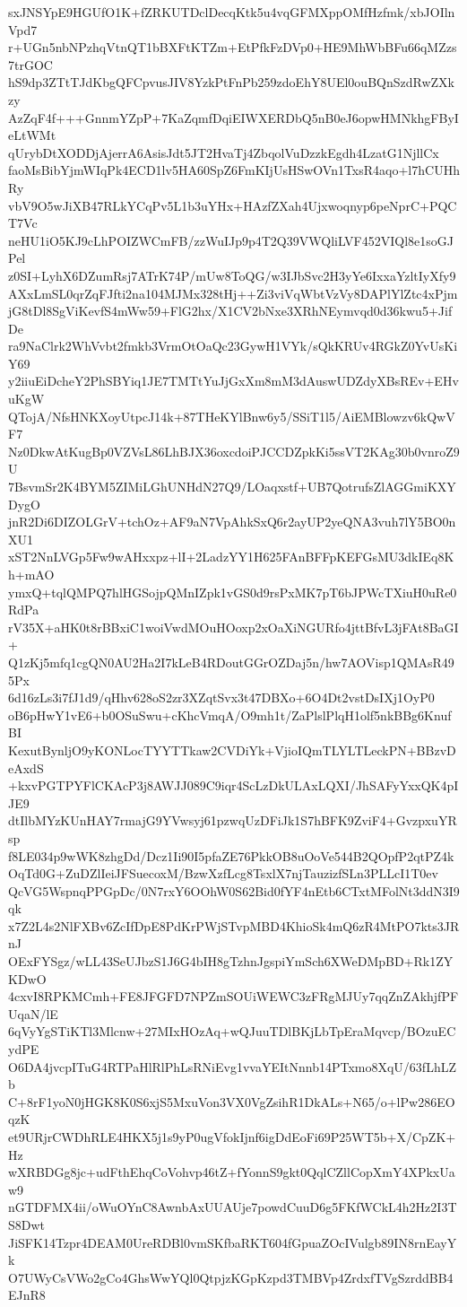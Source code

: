 sxJNSYpE9HGUfO1K+fZRKUTDclDecqKtk5u4vqGFMXppOMfHzfmk/xbJOIlnVpd7
r+UGn5nbNPzhqVtnQT1bBXFtKTZm+EtPfkFzDVp0+HE9MhWbBFu66qMZzs7trGOC
hS9dp3ZTtTJdKbgQFCpvusJIV8YzkPtFnPb259zdoEhY8UEl0ouBQnSzdRwZXkzy
AzZqF4f+++GnnmYZpP+7KaZqmfDqiEIWXERDbQ5nB0eJ6opwHMNkhgFByIeLtWMt
qUrybDtXODDjAjerrA6AsisJdt5JT2HvaTj4ZbqolVuDzzkEgdh4LzatG1NjllCx
faoMsBibYjmWIqPk4ECD1lv5HA60SpZ6FmKIjUsHSwOVn1TxsR4aqo+l7hCUHhRy
vbV9O5wJiXB47RLkYCqPv5L1b3uYHx+HAzfZXah4Ujxwoqnyp6peNprC+PQCT7Vc
neHU1iO5KJ9cLhPOIZWCmFB/zzWuIJp9p4T2Q39VWQliLVF452VIQl8e1soGJPel
z0SI+LyhX6DZumRsj7ATrK74P/mUw8ToQG/w3IJbSvc2H3yYe6IxxaYzltIyXfy9
AXxLmSL0qrZqFJfti2na104MJMx328tHj++Zi3viVqWbtVzVy8DAPlYlZtc4xPjm
jG8tDl8SgViKevfS4mWw59+FlG2hx/X1CV2bNxe3XRhNEymvqd0d36kwu5+JifDe
ra9NaClrk2WhVvbt2fmkb3VrmOtOaQc23GywH1VYk/sQkKRUv4RGkZ0YvUsKiY69
y2iiuEiDcheY2PhSBYiq1JE7TMTtYuJjGxXm8mM3dAuswUDZdyXBsREv+EHvuKgW
QTojA/NfsHNKXoyUtpcJ14k+87THeKYlBnw6y5/SSiT1l5/AiEMBlowzv6kQwVF7
Nz0DkwAtKugBp0VZVsL86LhBJX36oxcdoiPJCCDZpkKi5ssVT2KAg30b0vnroZ9U
7BsvmSr2K4BYM5ZIMiLGhUNHdN27Q9/LOaqxstf+UB7QotrufsZlAGGmiKXYDygO
jnR2Di6DIZOLGrV+tchOz+AF9aN7VpAhkSxQ6r2ayUP2yeQNA3vuh7lY5BO0nXU1
xST2NnLVGp5Fw9wAHxxpz+lI+2LadzYY1H625FAnBFFpKEFGsMU3dkIEq8Kh+mAO
ymxQ+tqlQMPQ7hlHGSojpQMnIZpk1vGS0d9rsPxMK7pT6bJPWcTXiuH0uRe0RdPa
rV35X+aHK0t8rBBxiC1woiVwdMOuHOoxp2xOaXiNGURfo4jttBfvL3jFAt8BaGI+
Q1zKj5mfq1cgQN0AU2Ha2I7kLeB4RDoutGGrOZDaj5n/hw7AOVisp1QMAsR495Px
6d16zLs3i7fJ1d9/qHhv628oS2zr3XZqtSvx3t47DBXo+6O4Dt2vstDsIXj1OyP0
oB6pHwY1vE6+b0OSuSwu+cKhcVmqA/O9mh1t/ZaPlslPlqH1olf5nkBBg6KnufBI
KexutBynljO9yKONLocTYYTTkaw2CVDiYk+VjioIQmTLYLTLeckPN+BBzvDeAxdS
+kxvPGTPYFlCKAcP3j8AWJJ089C9iqr4ScLzDkULAxLQXI/JhSAFyYxxQK4pIJE9
dtIlbMYzKUnHAY7rmajG9YVwsyj61pzwqUzDFiJk1S7hBFK9ZviF4+GvzpxuYRsp
f8LE034p9wWK8zhgDd/Dcz1Ii90I5pfaZE76PkkOB8uOoVe544B2QOpfP2qtPZ4k
OqTd0G+ZuDZlIeiJFSuecoxM/BzwXzfLcg8TsxlX7njTauzizfSLn3PLLcI1T0ev
QcVG5WspnqPPGpDc/0N7rxY6OOhW0S62Bid0fYF4nEtb6CTxtMFolNt3ddN3I9qk
x7Z2L4s2NlFXBv6ZcIfDpE8PdKrPWjSTvpMBD4KhioSk4mQ6zR4MtPO7kts3JRnJ
OExFYSgz/wLL43SeUJbzS1J6G4bIH8gTzhnJgspiYmSch6XWeDMpBD+Rk1ZYKDwO
4cxvI8RPKMCmh+FE8JFGFD7NPZmSOUiWEWC3zFRgMJUy7qqZnZAkhjfPFUqaN/lE
6qVyYgSTiKTl3Mlcnw+27MIxHOzAq+wQJuuTDlBKjLbTpEraMqvcp/BOzuECydPE
O6DA4jvcpITuG4RTPaHlRlPhLsRNiEvg1vvaYEItNnnb14PTxmo8XqU/63fLhLZb
C+8rF1yoN0jHGK8K0S6xjS5MxuVon3VX0VgZsihR1DkALs+N65/o+lPw286EOqzK
et9URjrCWDhRLE4HKX5j1s9yP0ugVfokIjnf6igDdEoFi69P25WT5b+X/CpZK+Hz
wXRBDGg8jc+udFthEhqCoVohvp46tZ+fYonnS9gkt0QqlCZllCopXmY4XPkxUaw9
nGTDFMX4ii/oWuOYnC8AwnbAxUUAUje7powdCuuD6g5FKfWCkL4h2Hz2I3TS8Dwt
JiSFK14Tzpr4DEAM0UreRDBl0vmSKfbaRKT604fGpuaZOcIVulgb89IN8rnEayYk
O7UWyCsVWo2gCo4GhsWwYQl0QtpjzKGpKzpd3TMBVp4ZrdxfTVgSzrddBB4EJnR8
